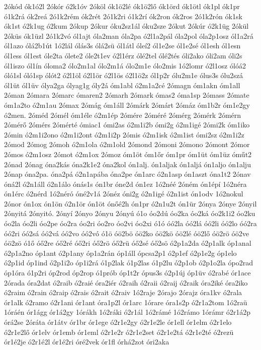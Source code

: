 {2ókód
ók1ó2l
2ókór
ó2k1óv
2óköl
ók1ö2lé
ók1ö2lő
ók1örd
ók1ötl
ók1pl
ók1pr
ó1k2rá
ók2reá
2ó1k2rém
ók2rét
2ó1k2ri
ó1k2rí
ók2ron
ók2ros
2ó1k2rón
ók1sk
ók1st
ó2k1ug
ó2kum
2ókup
2ókur
óku2sz1ál
óku2sze
2ókut
2ókúr
ó2k1üg
2ókül
2óküs
ók1üzl
2ó1k2vó
ól1ajt
óla2man
óla2pa
ó2l1a2pál
óla2pol
óla2p1osz
ól1a2rá
ól1azo
ólá2b1út
1ó2lál
ólás3s
ólá2sü
ól1átl
óleí2
ól1e2se
ól1e2sé
ól1esh
ól1esn
ól1ess
ól1est
óle2ta
ólete2
óle2t1ev
ó2l1érz
ólé2tel
ólé2tés
óli2ako
óli2am
óli2s
ól1iszo
ól1ín
óloma2
ólo2m1al
ólo2m1á
ólo2m1e
ólo2mis
1ó2lomr
ó2l1osz
ólóá2
óló1sl
óló1sp
ólót2
ó2l1öl
ó2l1ör
ó2l1ös
ó2l1ö2z
ól1p2r
ólu2m1e
ólus3s
ólu2szá
ól1üt
ól1üv
ólya2ga
ólyag1g
óly2á
óm1abl
ó2m1a2cé
2ómagn
óm1akn
óm1all
2óman
2ómara
2ómarc
ómaren2
2ómarh
2ómark
ómas2
óma1sp
2ómass
2ómate
óm1a2to
ó2m1au
2ómax
2ómág
óm1áll
2ómárk
2ómárt
2ómáz
óm1b2r
óm1e2gy
ó2men.
2óméd
2ómél
óm1éle
ó2m1ép
2ómére
2óméré
2ómérg
2ómérk
2ómérn
2ómérő
2ómérs
2ómérté
ómiac1
ómi2as
ó2m1i2b
ómi2g
ó2m1igé
2ómi2k
óm1iko
2ómin
ó2m1i2ono
ó2m1i2ont
ó2m1i2p
2ómis
ó2m1isk
ó2m1ist
ómi2sz
ó2m1i2z
2ómod
2ómog
2ómoh
ó2m1ola
ó2m1old
2ómond
2ómoni
2ómono
2ómont
2ómor
2ómos
ó2m1osz
2ómot
ó2m1ox
2ómoz
óm1öt
óm1őr
óm1pr
óm1üt
óm1üz
óműt2
2ónad
2ónag
óna2kás
óna2k1e2
óna2kol
ón1alj.
ón1aljak
ón1aljá
ón1aljo
ón1alju
2ónap
óna2pa.
óna2pá
ó2n1apába
óna2pe
ón1arc
ó2n1asp
ón1aszt
óna1t2
2ónav
óná2l
ó2n1áll
ó2n1álo
ónás1s
ón1br
óne2d
ón1ez
1ó2néé
2óném
ón1épí
1ó2néra
ón1érc
ó2nérd
1ó2néró
óné2v1á
2ónéz
óni2g
ó2n1igé
ó2n1ist
ón1odv
1ó2nokul
2ónor
ón1ox
ón1ön
ó2n1ör
ón1öt
ónőé2h
ón1pr
ó2n1u2t
ón1ür
2ónya
2ónye
2ónyil
2ónyitá
2ónyitó.
2ónyí
2ónyo
2ónyu
2ónyú
ó1o
óo2dú
óo2ka
óo2ká
óo2k1i2
óo2ku
óo2la
óo2li
óo2pe
óo2ra
óo2ri
óo2ro
óo2vi
óo2xi
ó1ó
óó2la
óó2lá
óó2li
óó2lo
óó2ra
óó2ri
óó2sá
óó2vá
óó2vo
óó2vó
ó1ö
óö2bö
óö2ko
óö2kö
óö2lé
óö2lő
óö2rö
óö2ve
óö2zö
ó1ő
óő2re
óő2ré
óő2ri
óő2rö
óő2rü
óő2sé
óő2sö
ó2p1a2da
ó2p1alk
óp1anal
ó2p1a2no
óp1ant
ó2p1any
óp1a2rán
óp1áll
ópcsa2p1
ó2p1ef
ó2p1e2g
óp1elo
ó2p1id
óp1ind
ó2p1i2o
óp1i2rá
ó1p2lak
ó1p2las
ó1p2lu
ó2p1ob
ó2p1o2la
ópo2rad
óp1óra
ó1p2ri
óp2rod
óp2rop
ó1prób
óp1t2r
ópus3s
ó2p1új
óp1üv
ó2rabé
ór1ace
2órada
óra2dat
ó2raib
ó2raié
óra2iér
ó2raih
ó2raii
ó2raij
ó2raik
óra2iké
óra2iko
ó2raim
ó2rain
ó2raip
ó2rais
ó2rait
ó2raiv
1ó2raje
2órajo
2órajz
óra1kv
ó2rala
ór1alk
ó2ramo
ó2r1ani
ór1ant
óra1p2l
ór1arc
1órare
óra1s2p
ó2r1a2tom
1ó2raü
1óráén
ór1ágg
ór1á2gy
1órákh
1ó2ráki
ó2r1ál
1ó2rámé
1ó2rámo
1órámr
ó2r1á2p
órá2se
2óráta
ór1átv
ór1br
ór1ege
ó2r1e2gy
ó2r1e2le
ór1ell
ór1elm
ó2r1elo
ó2r1e2lő
ór1elv
ór1emb
ór1eml
ó2r1e2r
ó2r1e2set
ó2r1e2tá
ó2r1e2té
ó2rezü
ór1é2je
ó2r1é2l
ór1é2ri
óré2vek
ór1fl
órhá2zot
óri2aka
}
